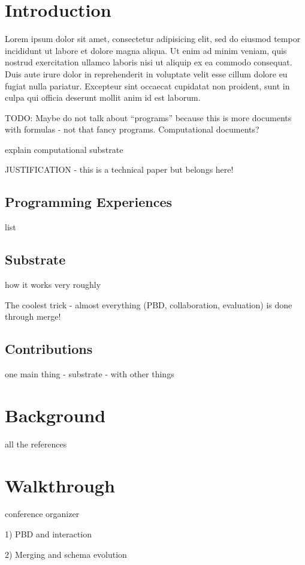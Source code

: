 \documentclass[sigconf]{acmart}
\begin{document}
\newpage

\section{Introduction}


Lorem ipsum dolor sit amet, consectetur adipisicing elit, sed do eiusmod tempor incididunt ut labore et dolore magna aliqua. Ut enim ad minim veniam, quis nostrud exercitation ullamco laboris nisi ut aliquip ex ea commodo consequat. Duis aute irure dolor in reprehenderit in voluptate velit esse cillum dolore eu fugiat nulla pariatur. Excepteur sint occaecat cupidatat non proident, sunt in culpa qui officia deserunt mollit anim id est laborum.

TODO: Maybe do not talk about ``programs'' because this is more documents with formulas - not that fancy programs.
Computational documents?

explain computational substrate

JUSTIFICATION - this is a technical paper but belongs here!

\subsection{Programming Experiences}
list

\subsection{Substrate}
how it works very roughly

The coolest trick - almost everything (PBD, collaboration, evaluation) is done through merge!

\subsection{Contributions}
one main thing - substrate - with other things


\section{Background}
all the references

\section{Walkthrough}
conference organizer

1) PBD and interaction

2) Merging and schema evolution
\end{document}
